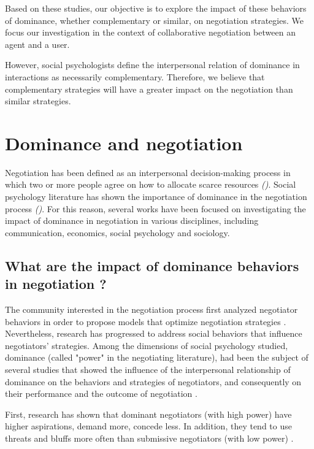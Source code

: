 \documentclass[10pt, a4paper, twocolumn]{article} %
\begin{document}
	Based on these studies, our objective is to explore the impact of these  behaviors of dominance, whether complementary or similar, on negotiation strategies. We focus our investigation in the context of collaborative negotiation between an agent and a user. 
	 
	However, social psychologists define the interpersonal relation of dominance in interactions as necessarily complementary. Therefore, we believe that complementary strategies will have a greater impact on the negotiation than similar strategies.
 
\section{Dominance and negotiation}	
	
	Negotiation has been defined as an interpersonal decision-making process in which two or more people agree on how to allocate scarce resources \emph{(\cite {thompson2000mind})}.  Social psychology literature has shown the importance of dominance in the negotiation process \emph{(\cite{de1995impact,van2006power,fiske1993controlling})}. For this reason, several works have been focused on investigating the impact of dominance in negotiation in various disciplines, including communication, economics, social psychology and sociology.
	
	\subsection{What are the impact of dominance behaviors in negotiation ?}
	
			The community interested in the negotiation process first analyzed negotiator behaviors in order to propose models that optimize negotiation strategies \cite{thompson2010negotiation}.
			Nevertheless, research has progressed to address  social behaviors that influence negotiators' strategies. 
			Among the dimensions of social psychology studied, dominance (called "power" in the negotiating literature), had been the subject of several studies that showed the influence of the interpersonal relationship of dominance on the behaviors and strategies of negotiators, and consequently on their performance and the outcome of negotiation \cite{de1995impact,van2006power}.
			
			First, research has shown that dominant negotiators (with high power) have higher aspirations, demand more, concede less. In addition, they tend to use threats and bluffs more often than submissive negotiators (with low power) \cite{de1995impact}.
			
\end{document}
